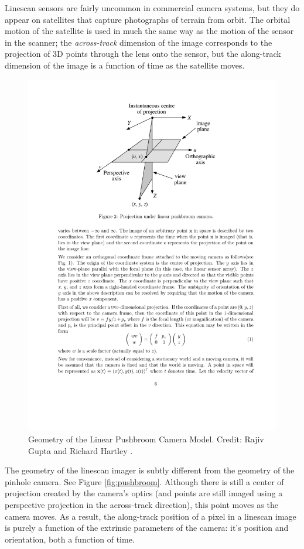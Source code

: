 Linescan sensors are fairly uncommon in commercial camera systems, but
they do appear on satellites that capture photographs of terrain from
orbit.  The orbital motion of the satellite is used in much the same
way as the motion of the sensor in the scanner; the {\em across-track}
dimension of the image corresponds to the projection of 3D points
through the lens onto the sensor, but the along-track dimension of the
image is a function of time as the satellite moves.  

\begin{figure}[tbp]
\begin{center}
  \includegraphics[width=5in]{images/pushbroom_geometry.pdf}
 \end{center}
  \label{fig:pinhole}
  \caption{Geometry of the Linear Pushbroom Camera Model.  Credit:
    Rajiv Gupta and Richard Hartley \cite{gupta97}.}
\end{figure}

The geometry of the linescan imager is subtly different from the
geometry of the pinhole camera.  See Figure \ref{fig:pushbroom}.
Although there is still a center of projection created by the camera's
optics (and points are still imaged using a perspective projection in
the across-track direction), this point moves as the camera moves.  As
a result, the along-track position of a pixel in a linescan image is
purely a function of the extrinsic parameters of the camera: it's
position and orientation, both a function of time.  

